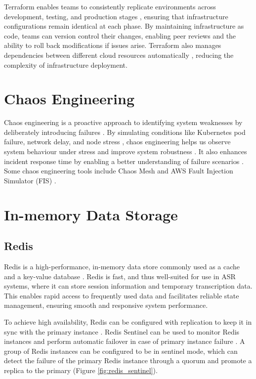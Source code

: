 Terraform enables teams to consistently replicate environments across development, testing, and production stages \cite{iac_benefits}, ensuring that infrastructure configurations remain identical at each phase. By maintaining infrastructure as code, teams can version control their changes, enabling peer reviews and the ability to roll back modifications if issues arise. Terraform also manages dependencies between different cloud resources automatically \cite{terraform_dependencies}, reducing the complexity of infrastructure deployment. 

\section{Chaos Engineering}
Chaos engineering is a proactive approach to identifying system weaknesses by deliberately introducing failures \cite{chaos_engineering_definition}. By simulating conditions like Kubernetes pod failure, network delay, and node stress \cite{chaos_mesh_feature}, chaos engineering helps us observe system behaviour under stress and improve system robustness \cite{chaos_engineering_definition}. It also enhances incident response time by enabling a better understanding of failure scenarios \cite{chaos_engineering_definition}. Some chaos engineering tools include Chaos Mesh \cite{chaos_mesh_introduction} and AWS Fault Injection Simulator (FIS) \cite{fis_introduction}.

\section{In-memory Data Storage}
\subsection{Redis}
Redis is a high-performance, in-memory data store commonly used as a cache and a key-value database \cite{redis_definition}. Redis is fast, and thus well-suited for use in ASR systems, where it can store session information and temporary transcription data. This enables rapid access to frequently used data and facilitates reliable state management, ensuring smooth and responsive system performance. 

To achieve high availability, Redis can be configured with replication to keep it in sync with the primary instance \cite{redis_replication}. Redis Sentinel can be used to monitor Redis instances and perform automatic failover in case of primary instance failure \cite{redis_sentinel}. A group of Redis instances can be configured to be in sentinel mode, which can detect the failure of the primary Redis instance through a quorum and promote a replica to the primary (Figure \ref{fig:redis_sentinel}).

